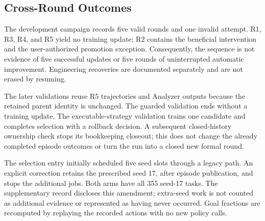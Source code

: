 \subsection{Cross-Round Outcomes}
\label{sec:round-results}

The development campaign records five valid rounds and one invalid
attempt. R1, R3, R4, and R5 yield no training update; R2 contains the
beneficial intervention and the user-authorized promotion exception.
Consequently, the sequence is not evidence of five successful updates
or five rounds of uninterrupted automatic improvement. Engineering
recoveries are documented separately and are not erased by resuming.

The later validations reuse R5 trajectories and Analyzer outputs because
the retained parent identity is unchanged. The guarded validation ends
without a training update. The executable-strategy validation trains one
candidate and completes selection with a rollback decision. A subsequent
closed-history ownership check stops its bookkeeping closeout; this does
not change the already completed episode outcomes or turn the run into
a closed new formal round.

The selection entry initially scheduled five seed slots through a legacy
path. An explicit correction retains the prescribed seed 17, after
episode publication, and stops the additional jobs. Both arms have all
355 seed-17 tasks. The supplementary record discloses this amendment;
extra-seed work is not counted as additional evidence or represented as
having never occurred. Goal fractions are recomputed by replaying the
recorded actions with no new policy calls.

